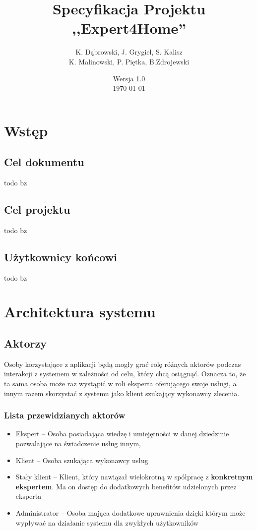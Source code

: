 \documentclass{article}
\title{Specyfikacja Projektu ,,Expert4Home''}
\author{K. Dąbrowski, J. Grygiel, S. Kalisz\\
K. Malinowski, P. Piętka, B.Zdrojewski}
\date{Wersja 1.0\\\today}
\begin{document}
	\maketitle
	\thispagestyle{empty}  
	\newpage
  
	\section{Wstęp} 
  
	\subsection{Cel dokumentu}
	todo bz
  
	\subsection{Cel projektu}
	todo bz
  
	\subsection{Użytkownicy końcowi}
	todo bz
  
	\section{Architektura systemu}
  
  \subsection{Aktorzy}
	Osoby korzystające z aplikacji będą mogły grać rolę różnych aktorów podczas interakcji z systemem w zależności od celu, który chcą osiągnąć.
	Oznacza to, że ta sama osoba może raz wystąpić w roli eksperta oferującego swoje usługi, a innym razem skorzystać z systemu jako klient szukający wykonawcy zlecenia.

	\subsubsection*{Lista przewidzianych aktorów}
	\begin{itemize}
		\item Ekspert -- Osoba posiadająca wiedzę i umiejętności w danej dziedzinie pozwalające na świadczenie usług innym,
		\item Klient -- Osoba szukająca wykonawcy usług
		\item Stały klient -- Klient, który nawiązał wielokrotną w spółpracę z \textbf{konkretnym ekspertem}. Ma on dostęp do dodatkowych benefitów udzielonych przez eksperta
		\item Administrator -- Osoba mająca dodatkowe uprawnienia dzięki którym może wypływać na działanie systemu dla zwykłych użytkowników
	\end{itemize}
	
\end{document}
